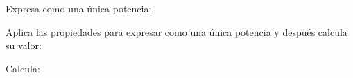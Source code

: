 \documentclass[addpoints,spanish, 12pt,a4paper]{exam}
\renewcommand*\half{.5}
\begin{document}
\begin{questions}

\question[1\half] Expresa como una única potencia:
\begin{multicols}{3}
\end{multicols}

\question[2] Aplica las propiedades para expresar como una única potencia y después calcula su valor:
\begin{multicols}{2}
\end{multicols}

\question[1\half] Calcula:


\end{questions}
\end{document}
